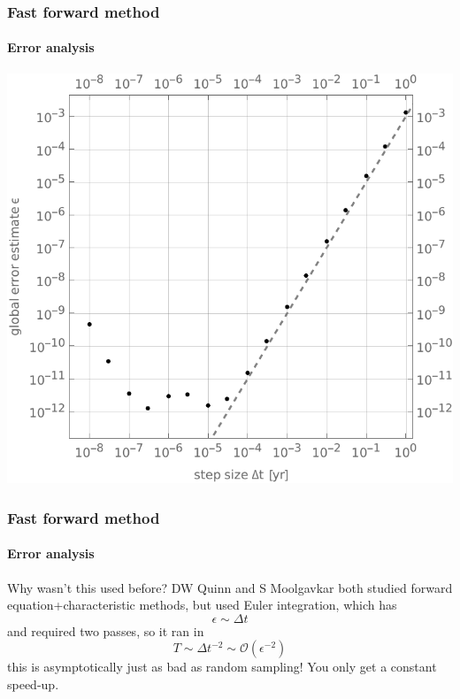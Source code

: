 \documentclass{beamer}
\begin{document}
\begin{frame}
    \frametitle{Fast forward method}
    \framesubtitle{Error analysis}
    \begin{center}
        \includegraphics[height=0.9\textheight]{figures/errors2}
    \end{center}
\end{frame}

\begin{frame}
    \frametitle{Fast forward method}
    \framesubtitle{Error analysis}

    Why wasn't this used before? DW Quinn and S Moolgavkar both studied forward
    equation+characteristic methods, but used Euler integration, which has
    \begin{equation}
        \epsilon \sim \Delta t
    \end{equation}
    and required two passes, so it ran in
    \begin{equation}
        T \sim \Delta t^{-2} \sim \mathcal{O}(\epsilon^{-2})
    \end{equation}
    this is asymptotically just as bad as random sampling! You only get a
    constant speed-up.
\end{frame}
\end{document}
